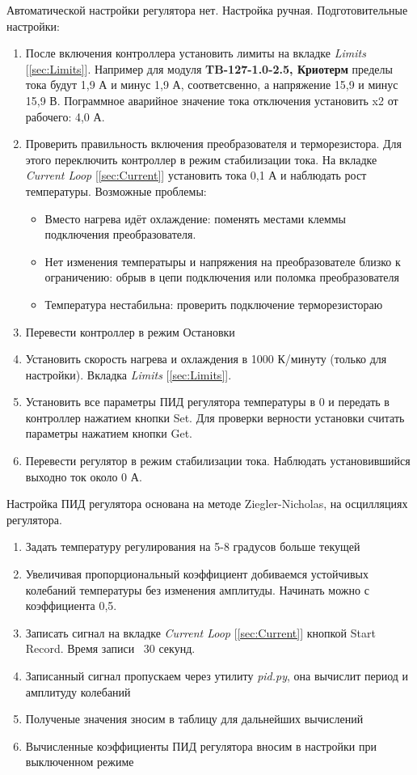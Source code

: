 Автоматической настройки регулятора нет. Настройка ручная.
Подготовительные настройки:
\begin{enumerate}
    \item   После включения контроллера установить лимиты на вкладке \textit{Limits} [\ref{sec:Limits}].
            Например для модуля \textbf{TB-127-1.0-2.5, Криотерм} пределы тока будут 1,9 А и минус 1,9 А, соответсвенно,
            а напряжение 15,9 и минус 15,9 В. Пограммное аварийное значение тока отключения установить x2 от рабочего: 4,0 А.

    \item   Проверить правильность включения преобразователя и терморезистора. Для этого переключить контроллер в
            режим стабилизации тока. На вкладке \textit{Current Loop} [\ref{sec:Current}] установить тока 0,1 А и наблюдать рост температуры.
            Возможные проблемы:
            \begin{itemize}
                \item Вместо нагрева идёт охлаждение: поменять местами клеммы подключения преобразователя.
                \item Нет изменения температыры и напряжения на преобразователе близко к ограничению: обрыв в цепи подключения или поломка преобразователя
                \item Температура нестабильна: проверить подключение терморезистораю
            \end{itemize}
    \item   Перевести контроллер в режим Остановки
    \item   Установить скорость нагрева и охлаждения в 1000 К/минуту (только для настройки). Вкладка \textit{Limits} [\ref{sec:Limits}].
    \item   Установить все параметры ПИД регулятора температуры в 0 и передать в контроллер нажатием кнопки Set.
            Для проверки верности установки считать параметры нажатием кнопки Get.
    \item   Перевести регулятор в режим стабилизации тока. Наблюдать установившийся выходно ток около 0 А.
\end{enumerate}

Настройка ПИД регулятора основана на методе Ziegler-Nicholas, на осцилляциях регулятора.

\begin{enumerate}
    \item Задать температуру регулирования на 5-8 градусов больше текущей
    \item Увеличивая пропорциональный коэффициент добиваемся устойчивых колебаний температуры без изменения амплитуды. Начинать можно с коэффициента 0,5.
    \item Записать сигнал на вкладке \textit{Current Loop} [\ref{sec:Current}] кнопкой Start Record. Время записи ~30 секунд.
    \item Записанный сигнал пропускаем через утилиту \textit{pid.py}, она вычислит период и амплитуду колебаний
    \item Полученые значения зносим в таблицу для дальнейших вычислений
    \item Вычисленные коэффициенты ПИД регулятора вносим в настройки при выключенном режиме
\end{enumerate}
